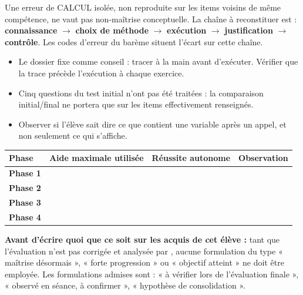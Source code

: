 \documentclass[10pt,a4paper]{article}
\begin{document}
Une erreur de \textsc{CALCUL} isolée, non reproduite sur les items voisins de même compétence, ne vaut pas non-maîtrise conceptuelle. La chaîne à reconstituer est : \textbf{connaissance} $\rightarrow$ \textbf{choix de méthode} $\rightarrow$ \textbf{exécution} $\rightarrow$ \textbf{justification} $\rightarrow$ \textbf{contrôle}. Les codes d'erreur du barème situent l'écart sur cette chaîne.
\begin{itemize}\item Le dossier fixe comme conseil : tracer à la main avant d'exécuter. Vérifier que la trace précède l'exécution à chaque exercice.\item Cinq questions du test initial n'ont pas été traitées : la comparaison initial/final ne portera que sur les items effectivement renseignés.\item Observer si l'élève sait dire ce que contient une variable après un appel, et non seulement ce qui s'affiche.\end{itemize}
\par\noindent\begin{tabularx}{\linewidth}{>{\bfseries}p{26mm} X X X}
\toprule Phase & Aide maximale utilisée & Réussite autonome & Observation \\ \midrule
Phase 1 & & & \\[6mm]
Phase 2 & & & \\[6mm]
Phase 3 & & & \\[6mm]
Phase 4 & & & \\[6mm]
\bottomrule\end{tabularx}
\begin{warningbox}\textbf{Avant d'écrire quoi que ce soit sur les acquis de cet élève :} tant que l'évaluation n'est pas corrigée et analysée par , aucune formulation du type « maîtrise désormais », « forte progression » ou « objectif atteint » ne doit être employée. Les formulations admises sont : « à vérifier lors de l'évaluation finale », « observé en séance, à confirmer », « hypothèse de consolidation ».\end{warningbox}
\end{document}
